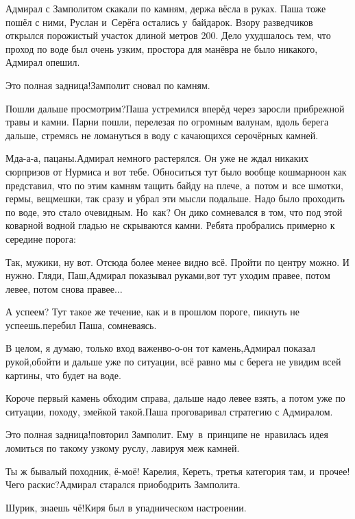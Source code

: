 Адмирал с Замполитом скакали по камням, держа вёсла в руках. Паша тоже пошёл с ними, Руслан и~Серёга остались у~байдарок. Взору разведчиков открылся порожистый участок длиной метров 200. Дело ухудшалось тем, что проход по воде был очень узким, простора для манёвра не было никакого, Адмирал опешил.

\diagdash Это полная задница!\mdash Замполит сновал по камням.

\diagdash Пошли дальше просмотрим?\mdash Паша устремился вперёд через заросли прибрежной травы и камни. Парни пошли, перелезая по огромным валунам, вдоль берега дальше, стремясь не ломануться в воду с качающихся серо\sdash чёрных камней.

\diagdash Мда-а-а, пацаны.\mdash Адмирал немного растерялся. Он уже не ждал никаких сюрпризов от Нурмиса и вот тебе. Обноситься тут было вообще кошмарно\mdash он как представил, что по этим камням тащить байду на плече, а~потом и~все шмотки, гермы, вещмешки, так сразу и убрал эти мысли подальше. Надо было проходить по воде, это стало очевидным. Но~как? Он дико сомневался в том, что под этой коварной водной гладью не скрываются камни. Ребята пробрались примерно к середине порога:

\diagdash Так, мужики, ну вот. Отсюда более менее видно всё. Пройти по центру можно. И нужно. Гляди, Паш,\mdash Адмирал показывал руками,\mdash вот тут уходим правее, потом левее, потом снова правее$\ldots$

\diagdash А успеем? Тут такое же течение, как и в прошлом пороге, пикнуть не успеешь.\mdash перебил Паша, сомневаясь.

\diagdash В целом, я думаю, только вход важен\mdash во-о-он тот камень,\mdash Адмирал показал рукой,\mdash обойти и дальше уже по ситуации, всё равно мы с берега не увидим всей картины, что будет на воде.

\diagdash Короче первый камень обходим справа, дальше надо левее взять, а потом уже по ситуации, походу, змейкой такой.\mdash Паша проговаривал стратегию с Адмиралом. 

\diagdash Это полная задница!\mdash повторил Замполит. Ему~в~принципе не~нравилась идея ломиться по такому узкому руслу, лавируя меж камней.

\diagdash Ты ж бывалый походник, ё-моё! Карелия, Кереть, третья категория там, и~прочее! Чего раскис?\mdash Адмирал старался приободрить Замполита.

\diagdash Шурик, знаешь чё!\mdash Киря был в упадническом настроении.

